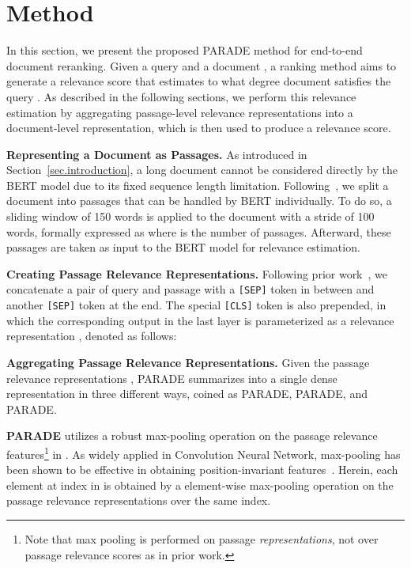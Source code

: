 \documentclass[11pt,a4paper]{article}
\newcommand{\parade}[1]{PARADE}
\newcommand{\paragraphHdTop}[1] {\noindent\textbf{#1}} \newcommand{\paragraphHd}[1] {\vspace{3pt}\noindent\textbf{#1}}
\begin{document}
 \section{Method}
In this section, we present the proposed PARADE method for end-to-end document reranking.
Given a query  and a document , a ranking method aims to generate a relevance score  that estimates to what degree document  satisfies the query .
As described in the following sections, we perform this relevance estimation by aggregating passage-level relevance representations into a document-level representation, which is then used to produce a relevance score.

\paragraphHdTop{Representing a Document as Passages.}
As introduced in Section~\ref{sec.introduction}, a long document cannot be considered directly by the BERT model due to its fixed sequence length limitation.
Following~\cite{DBLP:conf/sigir/DaiC19,DBLP:conf/sigir/Callan94}, we split a document into passages that can be handled by BERT individually.
To do so, a sliding window of 150 words is applied to the document with a stride of 100 words, formally expressed as  where  is the number of passages.
Afterward, these passages are taken as input to the BERT model for relevance estimation.

\paragraphHd{Creating Passage Relevance Representations.}
Following prior work~\cite{DBLP:journals/corr/abs-1901-04085},
we concatenate a pair of query  and passage  with a \texttt{[SEP]} token in between and another \texttt{[SEP]} token at the end. 
The special \texttt{[CLS]} token is also prepended, in which the corresponding output in the last layer is parameterized as a relevance representation , denoted as follows:



\paragraphHd{Aggregating Passage Relevance Representations.}
Given the passage relevance representations , PARADE summarizes  into a single dense representation  in three different ways, coined as \parade{Max}, \parade{Attn},  and PARADE.

{\bf \parade{Max}} utilizes a robust max-pooling operation on the passage relevance features\footnote{Note that max pooling is performed on passage \textit{representations}, not over passage relevance scores as in prior work.}
in . As widely applied in Convolution Neural Network, max-pooling has been shown to be effective in obtaining position-invariant features~\cite{DBLP:conf/icann/SchererMB10}.
Herein, each element at index  in  is obtained by a element-wise max-pooling operation on the passage relevance representations over the same index.
\end{document}
